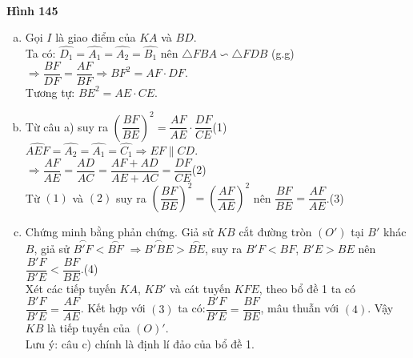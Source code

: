 \begin{vd}
{\begin{center}
\\
			\textbf{Hình 145}
		\end{center}
		\begin{enumerate}[a)]
			\item Gọi $I$ là giao điểm của $KA$ và $BD$.\\
			Ta có: $\widehat{D_1}=\widehat{A_1}=\widehat{A_2}=\widehat{B_1}$ nên $\triangle FBA\backsim \triangle FDB$ (g.g)\\
			$\Rightarrow \dfrac{BF}{DF}=\dfrac{AF}{BF}\Rightarrow BF^2=AF\cdot DF$.\\
			Tương tự: $BE^2=AE\cdot CE$.
			\item Từ câu a) suy ra $\left(\dfrac{BF}{BE}\right)^2=\dfrac{AF}{AE}\cdot\dfrac{DF}{CE}$\hfill(1)\\
			$\widehat{AEF}=\widehat{A_2}=\widehat{A_1}=\widehat{
				C_1}\Rightarrow EF\parallel CD$.\\
			$\Rightarrow \dfrac{AF}{AE}=\dfrac{AD}{AC}=\dfrac{AF+AD}{AE+AC}=\dfrac{DF}{CE}$\hfill(2)\\
			Từ $(1)$ và $(2)$ suy ra $\left(\dfrac{BF}{BE}\right)^2=\left(\dfrac{AF}{AE}\right)^2$ nên $\dfrac{BF}{BE}=\dfrac{AF}{AE}$.\hfill(3)
			\item Chứng minh bằng phản chứng. Giả sử $KB$ cắt đường tròn $(O')$ tại $B'$ khác $B$, giả sử $\overset\frown{B'F}<\overset\frown{BF}$ $\Rightarrow \overset\frown{B'BE}>\overset\frown{BE}$, suy ra $B'F<BF$, $B'E>BE$ nên $\dfrac{B'F}{B'E}<\dfrac{BF}{BE}$.\hfill(4)\\
			Xét các tiếp tuyến $KA$, $KB'$ và cát tuyến $KFE$, theo bổ đề 1 ta có $\dfrac{B'F}{B'E}=\dfrac{AF}{AE}$.
			Kết hợp với $(3)$ ta có:$\dfrac{B'F}{B'E}=\dfrac{BF}{BE}$, mâu thuẫn với $(4)$. Vậy $KB$ là tiếp tuyến của $(O)'$.\\
			Lưu ý: câu c) chính là định lí đảo của bổ đề 1.	
	\end{enumerate}}
\end{vd}


